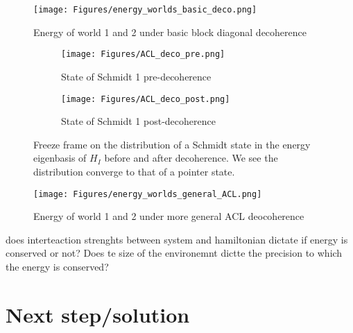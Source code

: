 \documentclass{article}
\begin{document}
\begin{figure}
    \centering
    \texttt{[image: Figures/energy\_worlds\_basic\_deco.png]}
    \caption{Energy of world 1 and 2 under basic block diagonal decoherence}
    \label{fig:enter-label}
\end{figure}

\begin{figure}[h!]
  \centering
  \begin{subfigure}[b]{0.49\linewidth}
    \texttt{[image: Figures/ACL\_deco\_pre.png]}
    \label{fig:1}
    \caption{State of Schmidt 1 pre-decoherence}
  \end{subfigure}
  \begin{subfigure}[b]{0.49\linewidth}
    \texttt{[image: Figures/ACL\_deco\_post.png]}
    \label{fig:2}
    \caption{State of Schmidt 1 post-decoherence}
  \end{subfigure}
  \caption{}
  \label{fig:dist_EI_dep}
  \caption{Freeze frame on the distribution of a Schmidt state in the energy eigenbasis of $H_I$ before and after decoherence. We see the distribution converge to that of a pointer state.}
\end{figure}

\begin{figure}
    \centering
    \texttt{[image: Figures/energy\_worlds\_general\_ACL.png]}
    \caption{Energy of world 1 and 2 under more general ACL deocoherence}
    \label{fig:enter-label}
\end{figure}

does interteaction strenghts between system and hamiltonian dictate if energy is conserved or not? 
Does te size of the environemnt dictte the precision to which the energy is conserved?


\section{Next step/solution}
\end{document}
